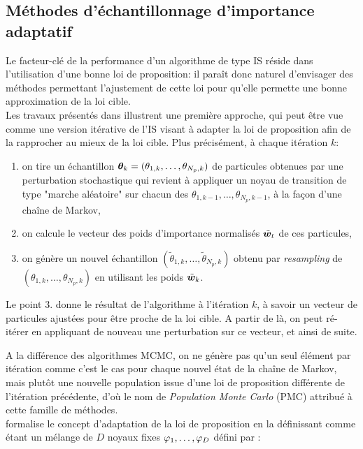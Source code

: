 \subsection{Méthodes d'échantillonnage d'importance adaptatif}

Le facteur-clé de la performance d'un algorithme de type IS réside dans l'utilisation d'une bonne loi de proposition: il paraît donc naturel d'envisager des méthodes permettant l'ajustement de cette loi pour qu'elle permette une bonne approximation de la loi cible. \\

Les travaux présentés dans \cite{Cappe2004} illustrent une première approche, qui peut être vue comme une version itérative de l'IS visant à adapter la loi de proposition afin de la rapprocher au mieux de la loi cible. Plus précisément, à chaque itération $k$: 
\begin{enumerate}
	\item on tire un échantillon ${\bm{\theta}}_k = (\theta_{1,k}, \dots, \theta_{N_p,k})$ de particules obtenues par une perturbation stochastique qui revient à appliquer un noyau de transition de type "marche aléatoire" sur chacun des $\theta_{1,k-1}, \dots, \theta_{N_p,k-1}$, à la façon d'une chaîne de Markov,
	\item on calcule le vecteur des poids d'importance normalisés ${\tilde{\bm{w}}}_t$ de ces particules,
	\item on génère un nouvel échantillon $(\tilde{\theta}_{1,k}, \dots, \tilde{\theta}_{N_p,k})$ obtenu par \textit{resampling} de $ (\theta_{1,k}, \dots, \theta_{N_p,k})$ en utilisant les poids ${\tilde{\bm{w}}}_k$.

\end{enumerate}

Le point 3. donne le résultat de l'algorithme à l'itération $k$, à savoir un vecteur de particules ajustées pour être proche de la loi cible. A partir de là, on peut ré-itérer en appliquant de nouveau une perturbation sur ce vecteur, et ainsi de suite. 

A la différence des algorithmes MCMC, on ne génère pas qu'un seul élément par itération comme c'est le cas pour chaque nouvel état de la chaîne de Markov, mais plutôt une nouvelle population issue d'une loi de proposition différente de l'itération précédente, d'où le nom de \textit{Population Monte Carlo} (PMC) attribué à cette famille de méthodes.\\

\cite{Douc2007} formalise le concept d'adaptation de la loi de proposition en la définissant comme étant un mélange de $D$ noyaux fixes ${\varphi}_1, \dots, {\varphi}_D$ défini par : 

